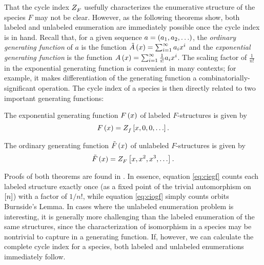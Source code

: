 \documentclass[sectionflow,singlespace,twoside,boldmathhdr,draft]{brandiss} %
\numberwithin{section}{chapter}
\numberwithin{figure}{chapter}
\begin{document}
That the cycle index $ Z_{F}^{} $ usefully characterizes the enumerative structure of the species $F$ may not be clear.
However, as the following theorems show, both labeled and unlabeled enumeration are immediately possible once the cycle index is in hand.
Recall that, for a given sequence $a = \left( {a_{1}, a_{2}, \dots} \right)$, the \emph{ordinary generating function} of $a$ is the function $\tilde{A} \left( {x} \right) = \sum_{i = 1}^{\infty} a_{i} x^{i}$ and the \emph{exponential generating function}  is the function $A \left( {x} \right) = \sum_{i = 1}^{\infty} \frac{1}{i!} a_{i} x^{i}$.
The scaling factor of $\frac{1}{n!}$ in the exponential generating function is convenient in many contexts; for example, it makes differentiation of the generating function a combinatorially-significant operation.
The cycle index of a species is then directly related to two important generating functions:
\begin{theorem}\label{thm:ciegf}
  The exponential generating function $F \left( {x} \right)$ of labeled $F$-structures is given by
  \begin{equation}\label{eq:ciegf}
    F \left( {x} \right) =  Z_{f}^{}  \left[ {x, 0, 0, \dots} \right].
  \end{equation}
\end{theorem}
\begin{theorem}\label{thm:ciogf}
  The ordinary generating function $\tilde{F} \left( {x} \right)$ of unlabeled $F$-structures is given by
  \begin{equation}\label{eq:ciogf}
    \tilde{F} \left( {x} \right) =  Z_{F}^{}  \left[ {x, x^{2}, x^{3}, \dots} \right].
  \end{equation}
\end{theorem}
Proofs of both theorems are found in \cite[\S 1.2]{bll:species}.
In essence, equation \eqref{eq:ciegf} counts each labeled structure exactly once (as a fixed point of the trivial automorphism on $\left[ {n} \right]$) with a factor of $1/n!$, while equation \eqref{eq:ciogf} simply counts orbits  Burnside's Lemma.
In cases where the unlabeled enumeration problem is interesting, it is generally more challenging than the labeled enumeration of the same structures, since the characterization of isomorphism in a species may be nontrivial to capture in a generating function.
If, however, we can calculate the complete cycle index for a species, both labeled and unlabeled enumerations immediately follow.
\end{document}
